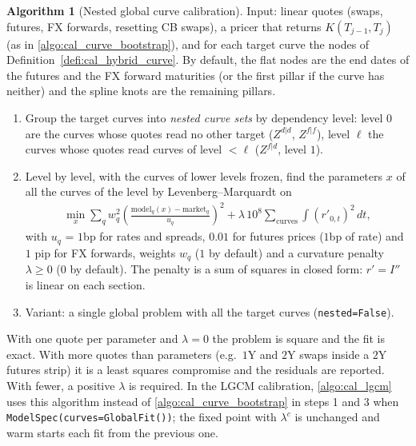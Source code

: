 \documentclass[11pt,english]{amsart}
\theoremstyle{definition}
\newtheorem{algo}{Algorithm}
\begin{document}
\begin{algo}[Nested global curve calibration]\label{algo:cal_global_curves}
Input: linear quotes (swaps, futures, FX forwards, resetting CB swaps), a pricer that returns $K(T_{j-1},T_j)$ (as in \autoref{algo:cal_curve_bootstrap}), and for each target curve the nodes of Definition~\ref{defi:cal_hybrid_curve}. By default, the flat nodes are the end dates of the futures and the FX forward maturities (or the first pillar if the curve has neither) and the spline knots are the remaining pillars.
\begin{enumerate}
\item Group the target curves into \emph{nested curve sets} by dependency level: level $0$ are the curves whose quotes read no other target ($Z^{d|d}$, $Z^{f|f}$), level $\ell$ the curves whose quotes read curves of level $<\ell$ ($Z^{f|d}$, level $1$).
\item Level by level, with the curves of lower levels frozen, find the parameters $x$ of all the curves of the level by Levenberg--Marquardt on
\begin{eqnarray*}
  \min_x \sum_q w_q^2\left(\frac{\text{model}_q(x) - \text{market}_q}{u_q}\right)^2 + \lambda\, 10^8 \sum_{\text{curves}}\int (r'_{0,t})^2\,dt ,
\end{eqnarray*}
with $u_q$ = $1$bp for rates and spreads, $0.01$ for futures prices ($1$bp of rate) and $1$ pip for FX forwards, weights $w_q$ ($1$ by default) and a curvature penalty $\lambda\ge0$ ($0$ by default). The penalty is a sum of squares in closed form: $r' = I''$ is linear on each section.
\item Variant: a single global problem with all the target curves (\texttt{nested=False}).
\end{enumerate}
With one quote per parameter and $\lambda = 0$ the problem is square and the fit is exact. With more quotes than parameters (e.g.\ $1$Y and $2$Y swaps inside a $2$Y futures strip) it is a least squares compromise and the residuals are reported. With fewer, a positive $\lambda$ is required. In the LGCM calibration, \autoref{algo:cal_lgcm} uses this algorithm instead of \autoref{algo:cal_curve_bootstrap} in steps 1 and 3 when \texttt{ModelSpec(curves=GlobalFit())}; the fixed point with $\lambda^c$ is unchanged and warm starts each fit from the previous one.
\end{algo}
\end{document}
